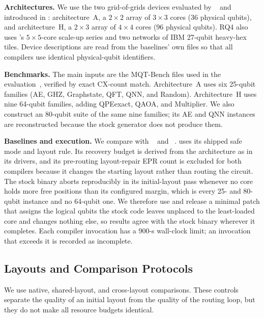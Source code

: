 \textbf{Architectures.} We use the two grid-of-grids devices evaluated by
\dSABRE{}~\cite{lidsabre} and introduced in \TeleSABRE{}: architecture~A, a $2{\times}2$ array of
$3{\times}3$ cores (36 physical qubits), and architecture~H, a
$2{\times}3$ array of $4{\times}4$ cores (96 physical qubits). RQ4 also
uses \dSABRE{}'s $5{\times}5$-core scale-up series and two networks of IBM
27-qubit heavy-hex tiles. Device descriptions are read from the baselines'
own files so that all compilers use identical physical-qubit identifiers.

\textbf{Benchmarks.} The main inputs are the MQT-Bench files used in the
\dSABRE{} evaluation~\cite{quetschlich2023mqtbench}, verified by exact
CX-count match. Architecture~A uses six 25-qubit families (AE, GHZ,
Graphstate, QFT, QNN, and Random). Architecture~H uses nine 64-qubit
families, adding QPEexact, QAOA, and Multiplier. We also construct an
80-qubit suite of the same nine families; its AE and QNN instances are
reconstructed because the stock generator does not produce them. 

\label{sec:baselines}
\textbf{Baselines and execution.} We compare with \TeleSABRE{}
~\cite{russo2025telesabre} and \dSABRE{}~\cite{lidsabre}. \dSABRE{} uses
its shipped safe mode and layout rule. Its recovery budget is derived from
the architecture as in its drivers, and its pre-routing layout-repair EPR
count is excluded for both compilers because it changes the starting layout
rather than routing the circuit. The stock \TeleSABRE{} binary aborts
reproducibly in its initial-layout pass whenever no core holds more free
positions than its configured margin, which is every 25- and 80-qubit instance
and no 64-qubit one. We therefore use and release a minimal patch that assigns
the logical qubits the stock code leaves unplaced to the least-loaded core and
changes nothing else, so results agree with the stock binary wherever it
completes.
Each compiler invocation has a 900-s wall-clock limit; an invocation that
exceeds it is recorded as incomplete.

\subsection{Layouts and Comparison Protocols}
\label{sec:protocols}

We use native, shared-layout, and cross-layout comparisons. These controls
separate the quality of an initial layout from the quality of the routing
loop, but they do not make all resource budgets identical.

